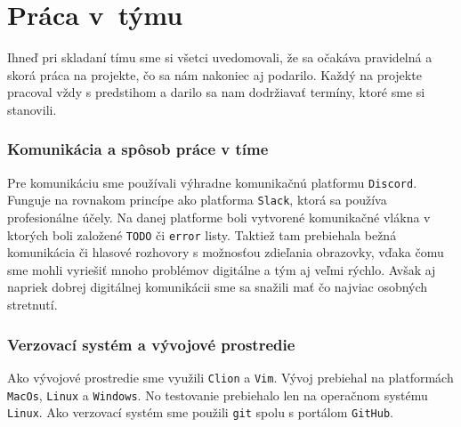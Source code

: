 \documentclass[a4paper, 11pt]{article}
\begin{document}
    \section{Práca v~týmu}
    Ihneď pri skladaní tímu sme si všetci uvedomovali, že sa
    očakáva pravidelná a skorá práca na projekte, čo sa nám nakoniec aj podarilo.
    Každý na projekte pracoval vždy s predstihom a darilo sa nam dodržiavať termíny,
    ktoré sme si stanovili.


    \subsubsection{Komunikácia a spôsob práce v tíme}
    Pre komunikáciu sme používali výhradne komunikačnú platformu \texttt{Discord}. Funguje na
    rovnakom princípe ako platforma \texttt{Slack}, ktorá sa používa profesionálne účely.
    Na danej platforme boli vytvorené komunikačné vlákna
    v ktorých boli založené \texttt{TODO} či \texttt{error} listy. Taktiež tam prebiehala bežná komunikácia či hlasové rozhovory s
    možnosťou zdieľania obrazovky, vďaka čomu sme mohli vyriešiť mnoho problémov
    digitálne a tým aj veľmi rýchlo. Avšak aj napriek
    dobrej digitálnej komunikácii sme sa snažili mať čo najviac
    osobných stretnutí.

    \subsubsection{Verzovací systém a vývojové prostredie}
    Ako vývojové prostredie sme využili \texttt{Clion} a \texttt{Vim}. Vývoj prebiehal na platformách \texttt{MacOs}, \texttt{Linux} a \texttt{Windows}. No
    testovanie prebiehalo len na operačnom systému \texttt{Linux}. Ako verzovací systém sme použili \texttt{git} spolu s portálom
    \texttt{GitHub}.
\end{document}

